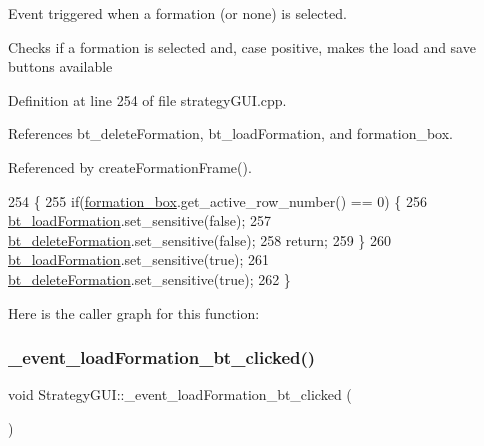 Event triggered when a formation (or none) is selected. 

Checks if a formation is selected and, case positive, makes the \textquotesingle{}load\textquotesingle{} and \textquotesingle{}save\textquotesingle{} buttons available 

Definition at line 254 of file strategy\+G\+U\+I.\+cpp.



References bt\+\_\+delete\+Formation, bt\+\_\+load\+Formation, and formation\+\_\+box.



Referenced by create\+Formation\+Frame().


\begin{DoxyCode}
254                                                \{
255     \textcolor{keywordflow}{if}(\hyperlink{class_strategy_g_u_i_a0f2ab3a2cdca1663def9c4ec1e366a5d}{formation\_box}.get\_active\_row\_number() == 0) \{
256         \hyperlink{class_strategy_g_u_i_a89efee7959e39e3c993080d88262521d}{bt\_loadFormation}.set\_sensitive(\textcolor{keyword}{false});
257         \hyperlink{class_strategy_g_u_i_acce16be9100c9d09a3a9ca2087b8370b}{bt\_deleteFormation}.set\_sensitive(\textcolor{keyword}{false});
258         \textcolor{keywordflow}{return};
259     \}
260     \hyperlink{class_strategy_g_u_i_a89efee7959e39e3c993080d88262521d}{bt\_loadFormation}.set\_sensitive(\textcolor{keyword}{true});
261     \hyperlink{class_strategy_g_u_i_acce16be9100c9d09a3a9ca2087b8370b}{bt\_deleteFormation}.set\_sensitive(\textcolor{keyword}{true});
262 \}
\end{DoxyCode}
Here is the caller graph for this function\+:
\mbox{\label{class_strategy_g_u_i_ac0caff70885aad2da169d808d97be3d2}} 
\subsubsection{\texorpdfstring{\+\_\+event\+\_\+load\+Formation\+\_\+bt\+\_\+clicked()}{\_event\_loadFormation\_bt\_clicked()}}
{\footnotesize\ttfamily void Strategy\+G\+U\+I\+::\+\_\+event\+\_\+load\+Formation\+\_\+bt\+\_\+clicked (\begin{DoxyParamCaption}{ }\end{DoxyParamCaption})\hspace{0.3cm}{\ttfamily [private]}}



